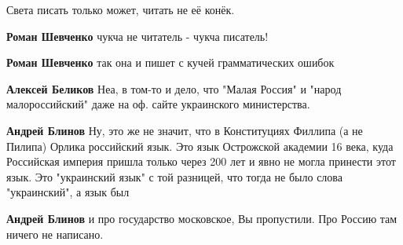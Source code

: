 \begin{itemize}
\begin{itemize}
Света писать только может, читать не её конёк.

 
\textbf{Роман Шевченко} чукча не читатель - чукча писатель!

 

\textbf{Роман Шевченко} так она и пишет с кучей грамматических ошибок

 
\textbf{Алексей Беликов} Неа, в том-то и дело, что "Малая Россия" и "народ малороссийский" даже на оф. сайте украинского министерства.

 
\textbf{Андрей Блинов} Ну, это же не значит, что в Конституциях Филлипа (а не Пилипа) Орлика российский язык. Это язык Острожской академии 16 века, куда Российская империя пришла только через 200 лет и явно не могла принести этот язык. Это "украинский язык" с той разницей, что тогда не было слова "украинский", а язык был

 
\textbf{Андрей Блинов} и про государство московское, Вы пропустили. Про Россию там ничего не написано.

 

\end{itemize}
\end{itemize}
